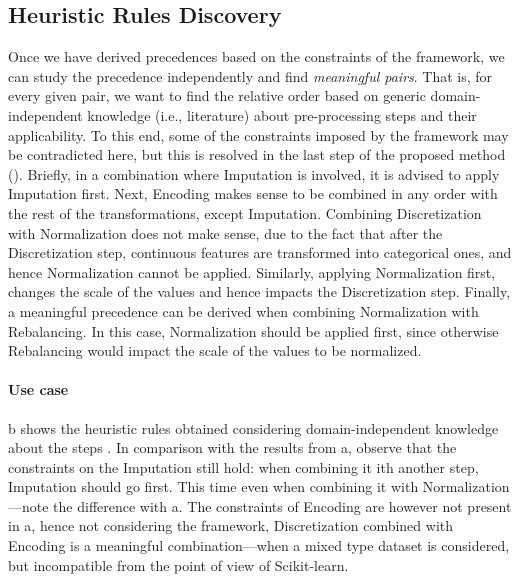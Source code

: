 \subsection{Heuristic Rules Discovery}
\label{effective-ssec:rules-heuristics}
Once we have derived precedences based on the constraints of the framework, we can study the precedence independently and find \textit{meaningful pairs}.
That is, for every given pair, we want to find the relative order based on generic domain-independent knowledge (i.e., literature) about pre-processing steps and their applicability.
To this end, some of the constraints imposed by the framework may be contradicted here, but this is resolved in the last step of the proposed method
().
Briefly, in a combination where Imputation is involved, it is advised to apply Imputation first.
Next, Encoding makes sense to be combined in any order with the rest of the transformations, except Imputation.
Combining Discretization with Normalization does not make sense, due to the fact that after the Discretization step, continuous features are transformed into categorical ones, and hence Normalization cannot be applied.
Similarly, applying Normalization first, changes the scale of the values and hence impacts the Discretization step.
Finally, a meaningful precedence can be derived when combining Normalization with Rebalancing.
In this case, Normalization should be applied first, since otherwise Rebalancing would impact the scale of the values to be normalized.

\paragraph{Use case}
b shows the heuristic rules obtained considering domain-independent knowledge about the steps \cite{BookExploratoryDM03Dasu}.
In comparison with the results from a, observe that the constraints on the Imputation still hold: when combining it ith another step, Imputation should go first.
This time even when combining it with Normalization---note the difference with a.
The constraints of Encoding are however not present in a, hence not considering the framework, Discretization combined with Encoding is a meaningful combination---when a mixed type dataset is considered, but incompatible from the point of view of Scikit-learn.

